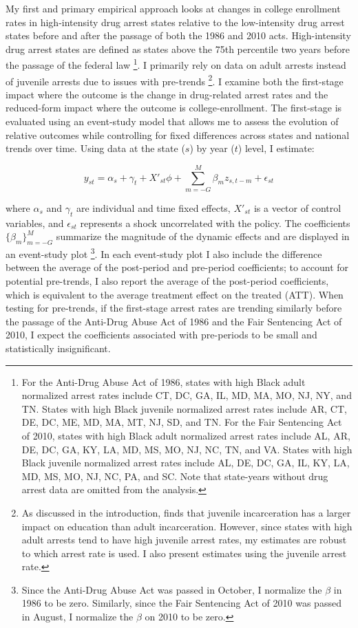 \documentclass{article}
\begin{document}
My first and primary empirical approach looks at changes in college enrollment rates in high-intensity drug arrest states relative to the low-intensity drug arrest states before and after the passage of both the 1986 and 2010 acts. High-intensity drug arrest states are defined as states above the 75th percentile two years before the passage of the federal law \footnote{For the Anti-Drug Abuse Act of 1986, states with high Black adult normalized arrest rates include CT, DC, GA, IL, MD, MA, MO, NJ, NY, and TN. States with high Black juvenile normalized arrest rates include AR, CT, DE, DC, ME, MD, MA, MT, NJ, SD, and TN. For the Fair Sentencing Act of 2010, states with high Black adult normalized arrest rates include AL, AR, DE, DC, GA, KY, LA, MD, MS, MO, NJ, NC, TN, and VA. States with high Black juvenile normalized arrest rates include AL, DE, DC, GA, IL, KY, LA, MD, MS, MO, NJ, NC, PA, and SC. Note that state-years without drug arrest data are omitted from the analysis.}. I primarily rely on data on adult arrests instead of juvenile arrests due to issues with pre-trends \footnote{As discussed in the introduction, \cite{aizer} finds that juvenile incarceration has a larger impact on education than adult incarceration. However, since states with high adult arrests tend to have high juvenile arrest rates, my estimates are robust to which arrest rate is used. I also present estimates using the juvenile arrest rate.}. I examine both the first-stage impact where the outcome is the change in drug-related arrest rates and the reduced-form impact where the outcome is college-enrollment. The first-stage is evaluated using an event-study model that allows me to assess the evolution of relative outcomes while controlling for fixed differences across states and national trends over time. Using data at the state ($s$) by year ($t$) level, I estimate:

\begin{equation} \label{eq:state_level_es}
  y_{st} = \alpha_s + \gamma_t + X'_{st} \phi + \sum_{m=-G}^{M} \beta_m z_{s,t-m} + \epsilon_{st}
\end{equation}

where $\alpha_s$ and $\gamma_t$ are individual and time fixed effects, $X'_{st}$ is a vector of control variables, and $\epsilon_{st}$ represents a shock uncorrelated with the policy. The coefficients $\{\beta_m \}^{M}_{m=-G}$ summarize the magnitude of the dynamic effects and are displayed in an event-study plot \footnote{Since the Anti-Drug Abuse Act was passed in October, I normalize the $\beta$ in 1986 to be zero. Similarly, since the Fair Sentencing Act of 2010 was passed in August, I normalize the $\beta$ on 2010 to be zero.}. In each event-study plot I also include the difference between the average of the post-period and pre-period coefficients; to account for potential pre-trends, I also report the average of the post-period coefficients, which is equivalent to the average treatment effect on the treated (ATT). When testing for pre-trends, if the first-stage arrest rates are trending similarly before the passage of the Anti-Drug Abuse Act of 1986 and the Fair Sentencing Act of 2010, I expect the coefficients associated with pre-periods to be small and statistically insignificant.
\end{document}
